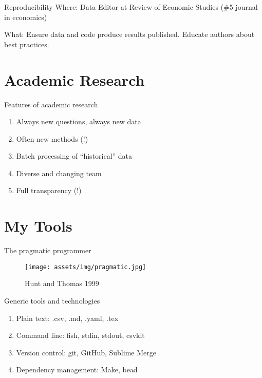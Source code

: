 \documentclass[
  ignorenonframetext,
  aspectratio=54,
]{beamer}
\providecommand{\tightlist}{%
  \setlength{\itemsep}{0pt}\setlength{\parskip}{0pt}}
\begin{document}
\begin{frame}{Reproducibility}
\protect\hypertarget{reproducibility}{}
Where: Data Editor at Review of Economic Studies (\#5 journal in
economics)

What: Ensure data and code produce results published. Educate authors
about best practices.
\end{frame}

\hypertarget{academic-research}{%
\section{Academic Research}\label{academic-research}}

\begin{frame}{Features of academic research}
\protect\hypertarget{features-of-academic-research}{}
\begin{enumerate}
\tightlist
\item
  Always new questions, always new data
\item
  Often new methods (!)
\item
  Batch processing of ``historical'' data
\item
  Diverse and changing team
\item
  Full transparency (!)
\end{enumerate}
\end{frame}

\hypertarget{my-tools}{%
\section{My Tools}\label{my-tools}}

\begin{frame}{The pragmatic programmer}
\protect\hypertarget{the-pragmatic-programmer}{}
\begin{figure}
\centering
\texttt{[image: assets/img/pragmatic.jpg]}
\caption{Hunt and Thomas 1999}
\end{figure}
\end{frame}

\begin{frame}{Generic tools and technologies}
\protect\hypertarget{generic-tools-and-technologies}{}
\begin{enumerate}
\tightlist
\item
  Plain text: .csv, .md, .yaml, .tex
\item
  Command line: fish, stdin, stdout, csvkit
\item
  Version control: git, GitHub, Sublime Merge
\item
  Dependency management: Make, bead
\end{enumerate}
\end{frame}
\end{document}

